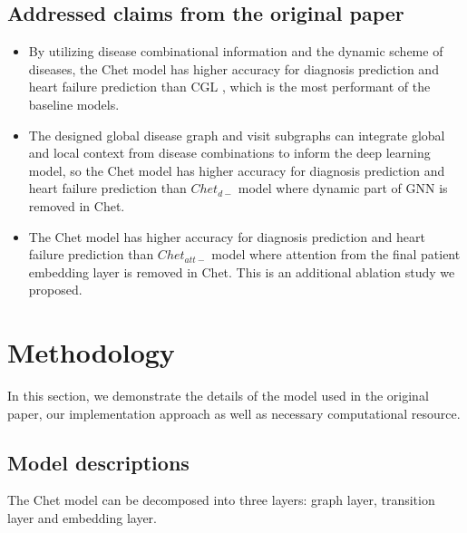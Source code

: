 \documentclass[11pt,a4paper,fleqn]{article}
\begin{document}
\subsection{Addressed claims from the original paper}
\begin{itemize}
    \item By utilizing disease combinational information and the dynamic scheme
    of diseases, the Chet model has higher accuracy for diagnosis prediction and
    heart failure prediction than CGL \cite{cgl}, which is the most performant
    of the baseline models. 
    \item The designed global disease graph and visit subgraphs can integrate
    global and local context from disease combinations to inform the deep
    learning model, so the Chet model has higher accuracy for diagnosis
    prediction and heart failure prediction than $Chet_{d-}$ model where
    dynamic part of GNN is removed in Chet.
    \item The Chet model has higher accuracy for diagnosis prediction and heart
    failure prediction than $Chet_{att-}$ model where attention from the final
    patient embedding layer is removed in Chet. This is an additional ablation
    study we proposed.
\end{itemize}

\section{Methodology}
In this section, we demonstrate the details of the model used in the original
paper, our implementation approach as well as necessary computational resource.
\subsection{Model descriptions}
The Chet model can be decomposed into three layers: graph layer, transition
layer and embedding layer.
\end{document}
